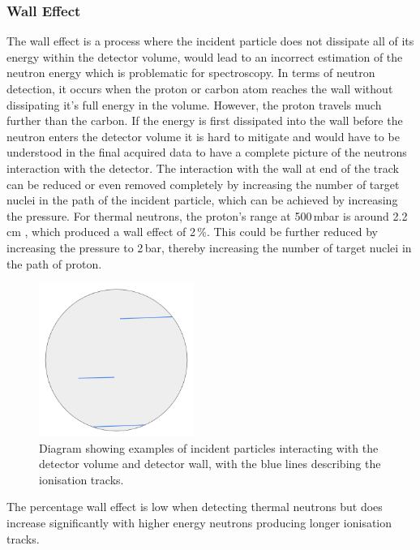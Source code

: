 \documentclass[a4paper]{article}
\begin{document}
\subsubsection{Wall Effect} \label{wall}
The wall effect is a process where the incident particle does not dissipate all of its energy within the detector volume, would lead to an incorrect estimation of the neutron energy which is problematic for spectroscopy. In terms of neutron detection, it occurs when the proton or carbon atom reaches the wall without dissipating it's full energy in the volume. However, the proton travels much further than the carbon. If the energy is first dissipated into the wall before the neutron enters the detector volume it is hard to mitigate and would have to be understood in the final acquired data to have a complete picture of the neutrons interaction with the detector.
The interaction with the wall at end of the track can be reduced or even removed completely by increasing the number of target nuclei in the path of the incident particle, which can be achieved by increasing the pressure. For thermal neutrons, the proton's range at 500\,mbar is around 2.2\,cm \cite{katsioulas_2016}, which produced a wall effect of 2\,\%. This could be further reduced by increasing the pressure to 2\,bar, thereby increasing the number of target nuclei in the path of proton. 
\begin{figure}[H]
    \centering
    \includegraphics[height=5cm]{plots/walll.png}
    \caption{Diagram showing examples of incident particles interacting with the detector volume and detector wall, with the blue lines describing the ionisation tracks.}
    \label{fig:wall}
\end{figure}
\noindent The percentage wall effect is low when detecting thermal neutrons but does increase significantly with higher energy neutrons producing longer ionisation tracks. 
\end{document}
